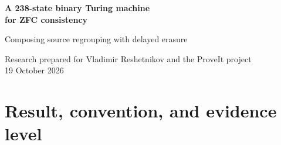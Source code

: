 \documentclass[11pt]{article}
\theoremstyle{definition}\newtheorem{definition}[theorem]{Definition}
\newcommand{\Con}{\operatorname{Con}}
\newcommand{\ZFC}{\mathrm{ZFC}}
\begin{document}
\begin{center}
{\Large\bfseries A 238-state binary Turing machine\\[4pt] for ZFC consistency}\par
\vspace{0.45em}
{\large Composing source regrouping with delayed erasure}\par
\vspace{0.35em}
Research prepared for Vladimir Reshetnikov and the ProveIt project\\
19 October 2026
\end{center}

\begin{abstract}
We construct an explicit binary, single-tape Turing machine with
\textbf{238 working states}, including its entire blank-tape initialization,
whose nonhalting is provably equivalent in ordinary ZFC to
$\Con(\ZFC)$.  The construction combines two distinct 239-state reductions
already present in ProveIt's incoming research: a source-boundary
reassociation with a decoder-context split, and a delayed-erasure reduction.
Their syntactically separate edits are not enough to justify composition.
We check the complete local dependencies, reprove the remaining selector
guard for the changed source, and independently verify every instruction
interface directly on the final 238-state table.

The final direct proof covers all 8,386 guarded cases of the 6,455-leaf source,
with arbitrary natural register values, arbitrary additional header gap, and
an arbitrary nonempty finite spare list.  It uses 2,255,513 symbolic proof
steps and has minimum instruction duration 13.  Independent sparse and dense
blank simulations agree on the entire tape after 409,835 transitions.
The archive contains the exact machine, source data, LaTeX, PDF, fresh
certificates, and portable standard-library Python replay.  The new endpoint
is an ordinary mathematical proof supported by executable certificates;
we do not supply a newly compiled Lean or Rocq theorem for the exact
238-state table or a serialized internal PA derivation.
\end{abstract}

\tableofcontents
\newpage

\section{Result, convention, and evidence level}
\label{sec:result}
\end{document}
